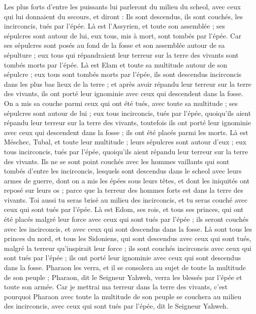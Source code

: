 \begin{multicols}{2}
Les plus forts d'entre les puissants lui parleront du milieu du scheol, avec ceux qui lui donnaient du secours, et diront : Ils sont descendus, ils sont couchés, les incirconcis, tués par l'épée.
Là est l'Assyrien, et toute son assemblée ; ses sépulcres sont autour de lui, eux tous, mis à mort, sont tombés par l'épée.
Car ses sépulcres sont posés au fond de la fosse et son assemblée autour de sa sépulture ; eux tous qui répandraient leur terreur sur la terre des vivants sont tombés morts par l'épée.
Là est Elam et toute sa multitude autour de son sépulcre ; eux tous sont tombés morts par l'épée, ils sont descendus incirconcis dans les plus bas lieux de la terre ; et après avoir répandu leur terreur sur la terre des vivants, ils ont porté leur ignominie avec ceux qui descendent dans la fosse.
On a mis sa couche parmi ceux qui ont été tués, avec toute sa multitude ; ses sépulcres sont autour de lui ; eux tous incirconcis, tués par l'épée, quoiqu'ils aient répandu leur terreur sur la terre des vivants, toutefois ils ont porté leur ignominie avec ceux qui descendent dans la fosse ; ils ont été placés parmi les morts.
Là est Méschec, Tubal, et toute leur multitude ; leurs sépulcres sont autour d'eux ; eux tous incirconcis, tués par l'épée, quoiqu'ils aient répandu leur terreur sur la terre des vivants.
Ils ne se sont point couchés avec les hommes vaillants qui sont tombés d'entre les incirconcis, lesquels sont descendus dans le scheol avec leurs armes de guerre, dont on a mis les épées sous leurs têtes, et dont les iniquités ont reposé sur leurs os ; parce que la terreur des hommes forts est dans la terre des vivants.
Toi aussi tu seras brisé au milieu des incirconcis, et tu seras couché avec ceux qui sont tués par l'épée.
Là est Edom, ses rois, et tous ses princes, qui ont été placés malgré leur force avec ceux qui sont tués par l'épée ; ils seront couchés avec les incirconcis, et avec ceux qui sont descendus dans la fosse.
Là sont tous les princes du nord, et tous les Sidoniens, qui sont descendus avec ceux qui sont tués, malgré la terreur qu'inspirait leur force ; ils sont couchés incirconcis avec ceux qui sont tués par l'épée ; ils ont porté leur ignominie avec ceux qui sont descendus dans la fosse.
Pharaon les verra, et il se consolera au sujet de toute la multitude de son peuple ; Pharaon, dit le Seigneur Yahweh, verra les blessés par l'épée et toute son armée.
Car je mettrai ma terreur dans la terre des vivants, c'est pourquoi Pharaon avec toute la multitude de son peuple se couchera au milieu des incirconcis, avec ceux qui sont tués par l'épée, dit le Seigneur Yahweh.

\end{multicols}

